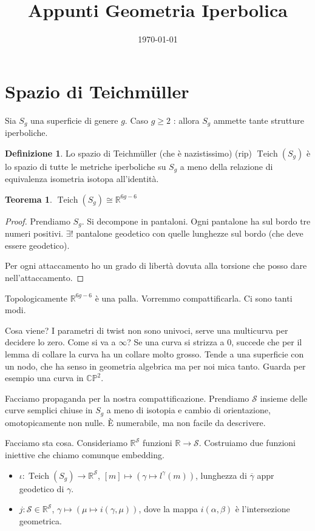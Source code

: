 \documentclass[a4paper]{article}
\title{Appunti Geometria Iperbolica}
\date{\today}
\newtheorem{theorem}{Teorema}
\theoremstyle{definition}
\newtheorem{definition}{Definizione}
\DeclareMathOperator{\Teich}{Teich}
\begin{document}
    \maketitle
    
\section{Spazio di Teichmüller}

    Sia $S_g$ una superficie di genere $g$. Caso $g \geq 2$ : allora $S_g$ ammette tante strutture iperboliche.

    \begin{definition}
        Lo spazio di Teichmüller (che è nazistissimo) (rip) $\Teich(S_g)$ è lo spazio di tutte le metriche iperboliche su $S_g$ a meno della relazione di equivalenza isometria isotopa all'identità.
    \end{definition}

    \begin{theorem}
        $\Teich(S_g) \cong \mathbb R^{6g-6}$
    \end{theorem}

    \begin{proof}
        Prendiamo $S_g$. Si decompone in pantaloni. Ogni pantalone ha sul bordo tre numeri positivi. $\exists!$ pantalone geodetico con quelle lunghezze sul bordo (che deve essere geodetico).

        Per ogni attaccamento ho un grado di libertà dovuta alla torsione che posso dare nell'attaccamento.
    \end{proof}
    
    Topologicamente $\mathbb R^{6g-6}$ è una palla. Vorremmo compattificarla. Ci sono tanti modi.

    Cosa viene? I parametri di twist non sono univoci, serve una multicurva per decidere lo zero. Come si va a $\infty$? Se una curva si strizza a $0$, succede che per il lemma di collare la curva ha un collare molto grosso. Tende a una superficie con un nodo, che ha senso in geometria algebrica ma per noi mica tanto. Guarda per esempio una curva in $\mathbb {CP}^2$.

    Facciamo propaganda per la nostra compattificazione. Prendiamo $\mathcal S$ insieme delle curve semplici chiuse in $S_g$ a meno di isotopia e cambio di orientazione, omotopicamente non nulle. È numerabile, ma non facile da descrivere.

    Facciamo sta cosa. Consideriamo $\mathbb R^\mathcal S$ funzioni $\mathbb R \to \mathcal S$. Costruiamo due funzioni iniettive che chiamo comunque embedding.
    \begin{itemize}
        \item $\iota: \Teich(S_g) \to \mathbb R^\mathcal{S}$, $[m] \mapsto \left(\gamma \mapsto l^\gamma(m)\right)$, lunghezza di $\overline{\gamma}$ appr geodetico di $\gamma$.
        \item $j: \mathcal S \in \mathbb R^{\mathcal S}$, $\gamma \mapsto (\mu \mapsto i(\gamma,\mu))$, dove la mappa $i(\alpha,\beta)$ è l'intersezione geometrica.
    \end{itemize}
\end{document}
